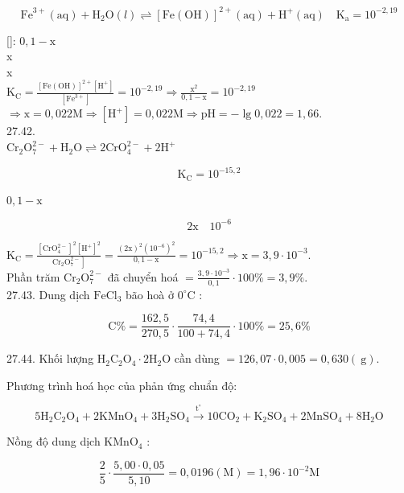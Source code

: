 \documentclass[10pt]{article}
\begin{document}
$$
\mathrm{Fe}^{3+}(\mathrm{aq})+\mathrm{H}_{2} \mathrm{O}(l) \rightleftharpoons[\mathrm{Fe}(\mathrm{OH})]^{2+}(\mathrm{aq})+\mathrm{H}^{+}(\mathrm{aq}) \quad \mathrm{K}_{\mathrm{a}}=10^{-2,19}
$$

[]: $0,1-\mathrm{x}$\\
x\\
x\\
$\mathrm{K}_{\mathrm{C}}=\frac{[\mathrm{Fe}(\mathrm{OH})]^{2+}\left[\mathrm{H}^{+}\right]}{\left[\mathrm{Fe}^{3+}\right]}=10^{-2,19} \Rightarrow \frac{\mathrm{x}^{2}}{0,1-\mathrm{x}}=10^{-2,19}$\\
$\Rightarrow \mathrm{x}=0,022 \mathrm{M} \Rightarrow\left[\mathrm{H}^{+}\right]=0,022 \mathrm{M} \Rightarrow \mathrm{pH}=-\lg 0,022=1,66$.\\
27.42.\\
$\mathrm{Cr}_{2} \mathrm{O}_{7}^{2-}+\mathrm{H}_{2} \mathrm{O} \rightleftharpoons 2 \mathrm{CrO}_{4}^{2-}+2 \mathrm{H}^{+}$

$$
\mathrm{K}_{\mathrm{C}}=10^{-15,2}
$$

$0,1-\mathrm{x}$

$$
2 \mathrm{x} \quad 10^{-6}
$$

$\mathrm{K}_{\mathrm{C}}=\frac{\left[\mathrm{CrO}_{4}^{2-}\right]^{2}\left[\mathrm{H}^{+}\right]^{2}}{\left.\mathrm{Cr}_{2} \mathrm{O}_{7}^{2-}\right]}=\frac{(2 \mathrm{x})^{2}\left(10^{-6}\right)^{2}}{0,1-\mathrm{x}}=10^{-15,2} \Rightarrow \mathrm{x}=3,9 \cdot 10^{-3}$.\\
Phần trăm $\mathrm{Cr}_{2} \mathrm{O}_{7}^{2-}$ đã chuyển hoá $=\frac{3,9 \cdot 10^{-3}}{0,1} \cdot 100 \%=3,9 \%$.\\
27.43. Dung dịch $\mathrm{FeCl}_{3}$ bão hoà ở $0^{\circ} \mathrm{C}$ :

$$
\mathrm{C} \%=\frac{162,5}{270,5} \cdot \frac{74,4}{100+74,4} \cdot 100 \%=25,6 \%
$$

27.44. Khối lượng $\mathrm{H}_{2} \mathrm{C}_{2} \mathrm{O}_{4} \cdot 2 \mathrm{H}_{2} \mathrm{O}$ cần dùng $=126,07 \cdot 0,005=0,630(\mathrm{~g})$.

Phương trình hoá học của phản ứng chuẩn độ:

$$
5 \mathrm{H}_{2} \mathrm{C}_{2} \mathrm{O}_{4}+2 \mathrm{KMnO}_{4}+3 \mathrm{H}_{2} \mathrm{SO}_{4} \xrightarrow{\mathrm{t}^{\circ}} 10 \mathrm{CO}_{2}+\mathrm{K}_{2} \mathrm{SO}_{4}+2 \mathrm{MnSO}_{4}+8 \mathrm{H}_{2} \mathrm{O}
$$

Nồng độ dung dịch $\mathrm{KMnO}_{4}$ :

$$
\frac{2}{5} \cdot \frac{5,00 \cdot 0,05}{5,10}=0,0196(\mathrm{M})=1,96 \cdot 10^{-2} \mathrm{M}
$$
\end{document}
